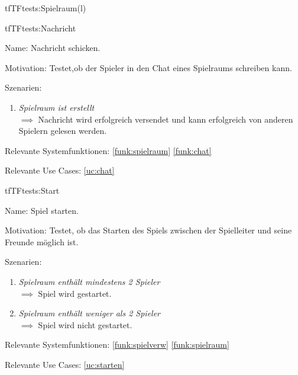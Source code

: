 \begin{description}[leftmargin=5em, style=sameline]
\begin{lhp}{tf}{TF}{tests:Spielraum(l)}
\end{lhp}

\begin{lhp}{tf}{TF}{tests:Nachricht}
	\item [Name:] Nachricht schicken.
	\item [Motivation:] Testet,ob der Spieler in den Chat eines Spielraums schreiben kann.
	\item [Szenarien:] \hfill
		\begin{enumerate}
			\item \textit{Spielraum ist erstellt} \\ $\implies$ Nachricht wird erfolgreich versendet und kann erfolgreich von anderen Spielern gelesen werden.
		\end{enumerate}
	\item [Relevante Systemfunktionen:] \ref{funk:spielraum} \ref{funk:chat}
	\item [Relevante Use Cases:] \ref{uc:chat}
\end{lhp}

\begin{lhp}{tf}{TF}{tests:Start}
	\item [Name:] Spiel starten.
	\item [Motivation:] Testet, ob das Starten des Spiels zwischen der Spielleiter und seine Freunde möglich ist.
	\item [Szenarien:] \hfill
		\begin{enumerate}
			\item \textit{Spielraum enthält mindestens 2 Spieler} \\ $\implies$ Spiel wird gestartet.
			\item \textit{Spielraum enthält weniger als 2 Spieler} \\ $\implies$ Spiel wird nicht gestartet.
		\end{enumerate}
	\item [Relevante Systemfunktionen:] \ref{funk:spielverw} \ref{funk:spielraum}
	\item [Relevante Use Cases:] \ref{uc:starten}
\end{lhp}


\end{description}
